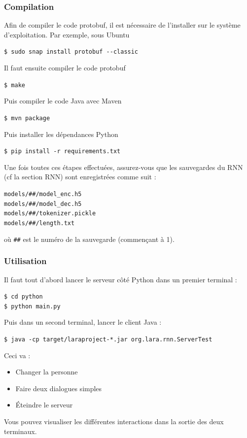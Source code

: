 \documentclass[10pt,a4paper]{article}
\begin{document}
\subsubsection{Compilation}
Afin de compiler le code protobuf, il est nécessaire de l'installer sur le système d'exploitation. Par exemple, sous Ubuntu
\begin{center}
	\texttt{\$ sudo snap install protobuf -{}-classic}
\end{center}
Il faut ensuite compiler le code protobuf
\begin{center}
	\texttt{\$ make}
\end{center}
Puis compiler le code Java avec Maven
\begin{center}
	\texttt{\$ mvn package}
\end{center}
Puis installer les dépendances Python
\begin{center}
	\texttt{\$ pip install -r requirements.txt}
\end{center}
Une fois toutes ces étapes effectuées, assurez-vous que les sauvegardes du RNN (cf la section RNN) sont enregistrées comme suit :
\begin{center}
	\texttt{models/\#\#/model\_enc.h5} \\
	\texttt{models/\#\#/model\_dec.h5} \\
	\texttt{models/\#\#/tokenizer.pickle} \\
	\texttt{models/\#\#/length.txt}
\end{center}
où \texttt{\#\#} est le numéro de la sauvegarde (commençant à 1).
\subsubsection{Utilisation}
Il faut tout d'abord lancer le serveur côté Python dans un premier terminal :
\begin{center}
	\texttt{\$ cd python} \\
	\texttt{\$ python main.py}
\end{center}
Puis dans un second terminal, lancer le client Java :
\begin{center}
	\texttt{\$ java -cp target/laraproject-*.jar org.lara.rnn.ServerTest}
\end{center}
Ceci va :
\begin{itemize}
	\item Changer la personne
	\item Faire deux dialogues simples
	\item Éteindre le serveur
\end{itemize}
Vous pouvez visualiser les différentes interactions dans la sortie des deux terminaux.
\end{document}
